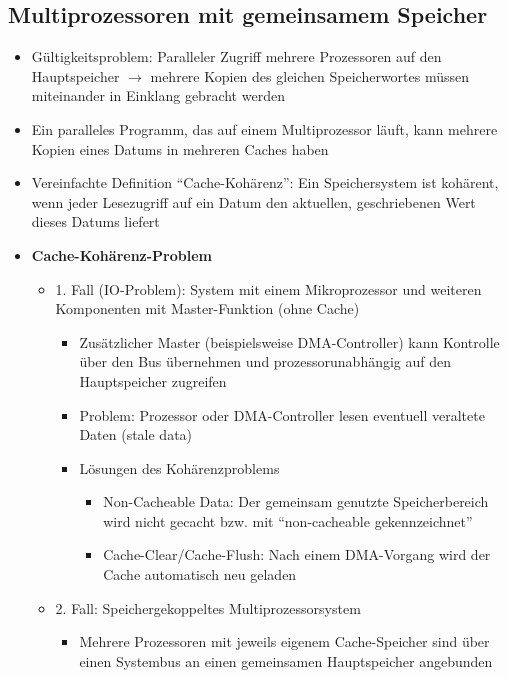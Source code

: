 \subsection{Multiprozessoren mit gemeinsamem Speicher}
\begin{itemize}
	\item Gültigkeitsproblem: Paralleler Zugriff mehrere Prozessoren auf den Hauptspeicher \(\rightarrow\) mehrere Kopien des gleichen Speicherwortes müssen miteinander in Einklang gebracht werden
	\item Ein paralleles Programm, das auf einem Multiprozessor läuft, kann mehrere Kopien eines Datums in mehreren Caches haben
	\item Vereinfachte Definition "`Cache-Kohärenz"': Ein Speichersystem ist kohärent, wenn jeder Lesezugriff auf ein Datum den aktuellen, geschriebenen Wert dieses Datums liefert
	\item \textbf{Cache-Kohärenz-Problem}
	\begin{itemize}
		\item 1. Fall (IO-Problem): System mit einem Mikroprozessor und weiteren Komponenten mit Master-Funktion (ohne Cache)
		\begin{itemize}
			\item Zusätzlicher Master (beispielsweise DMA-Controller) kann Kontrolle über den Bus übernehmen und prozessorunabhängig auf den Hauptspeicher zugreifen
			\item Problem: Prozessor oder DMA-Controller lesen eventuell veraltete Daten (stale data)
			\item Lösungen des Kohärenzproblems
			\begin{itemize}
				\item Non-Cacheable Data: Der gemeinsam genutzte Speicherbereich wird nicht gecacht bzw. mit "`non-cacheable gekennzeichnet"'
				\item Cache-Clear/Cache-Flush: Nach einem DMA-Vorgang wird der Cache automatisch neu geladen
			\end{itemize}
		\end{itemize}
		\item 2. Fall: Speichergekoppeltes Multiprozessorsystem
		\begin{itemize}
			\item Mehrere Prozessoren mit jeweils eigenem Cache-Speicher sind über einen Systembus an einen gemeinsamen Hauptspeicher angebunden
		\end{itemize}
	\end{itemize}
\end{itemize}
